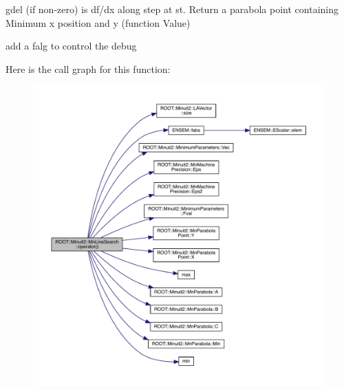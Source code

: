gdel (if non-\/zero) is df/dx along step at st. Return a parabola point containing Minimum x position and y (function Value)
\begin{DoxyItemize}
\item add a falg to control the debug 
\end{DoxyItemize}Here is the call graph for this function\+:
\nopagebreak
\begin{figure}[H]
\begin{center}
\leavevmode
\includegraphics[width=350pt]{d0/dd1/classROOT_1_1Minuit2_1_1MnLineSearch_a4caf80e70d50f3bfa149d28836d26a95_cgraph}
\end{center}
\end{figure}
\mbox{\label{classROOT_1_1Minuit2_1_1MnLineSearch_a4caf80e70d50f3bfa149d28836d26a95}} 

